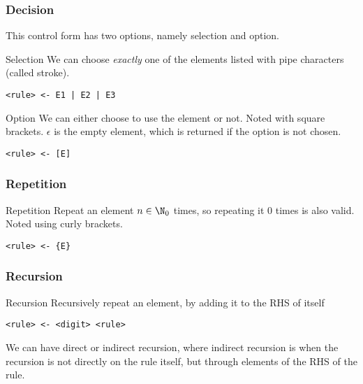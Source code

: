 \subsubsection{Decision}
This control form has two options, namely selection and option.

\begin{definition}[]{Selection}
    We can choose \textit{exactly} one of the elements listed with pipe characters (called stroke).

    \begin{verbatim}
<rule> <- E1 | E2 | E3
    \end{verbatim}
\end{definition}

\begin{definition}[]{Option}
    We can either choose to use the element or not. Noted with square brackets. $\epsilon$ is the empty element, which is returned if the option is not chosen.

    \begin{verbatim}
<rule> <- [E]
    \end{verbatim}
\end{definition}

\subsubsection{Repetition}
\begin{definition}[]{Repetition}
    Repeat an element $n \in \N_0$ times, so repeating it $0$ times is also valid. Noted using curly brackets.

    \begin{verbatim}
<rule> <- {E}
    \end{verbatim}
\end{definition}


\subsubsection{Recursion}
\begin{definition}[]{Recursion}
    Recursively repeat an element, by adding it to the RHS of itself

    \begin{verbatim}
<rule> <- <digit> <rule>
    \end{verbatim}
\end{definition}

We can have direct or indirect recursion, where indirect recursion is when the recursion is not directly on the rule itself, but through elements of the RHS of the rule.

